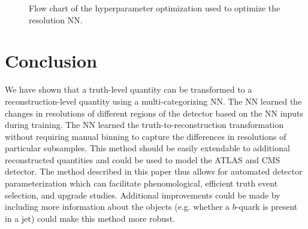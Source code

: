 \documentclass[showpacs,showkeys,preprint,prd,nofootinbib,linenumbers,12pt,superscriptaddress]{revtex4-1}
\begin{document}
\begin{figure}[htb]
  \caption{Flow chart of the hyperparameter optimization used to optimize the resolution NN.}
  \label{fig:hyperFlow}
\end{figure}

\section{Conclusion}

We have shown that a truth-level quantity can be transformed to a reconstruction-level quantity using a multi-categorizing NN. The NN learned the changes in resolutions of different regions of the detector based on the NN inputs during training. The NN learned the truth-to-reconstruction transformation without requiring manual binning to capture the differences in resolutions of particular subsamples. This method should be easily extendable to additional reconstructed quantities and could be used to model the ATLAS and CMS detector. The method described in this paper thus allows for automated detector parameterization which can facilitate phenomological, efficient truth event selection, and upgrade studies. Additional improvements could be made by including more information about the objects (e.g. whether a $b$-quark is present in a jet) could make this method more robust. 
\end{document}
